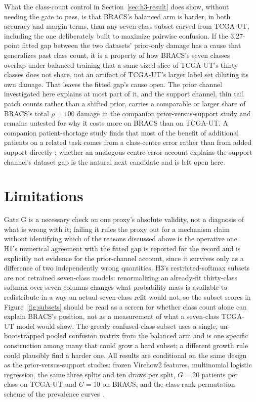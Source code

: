 What the class-count control in Section~\ref{sec:h3-result} does show, without needing the gate to pass, is that BRACS's balanced arm is harder, in both accuracy and margin terms, than any seven-class subset carved from TCGA-UT, including the one deliberately built to maximize pairwise confusion. If the 3.27-point fitted gap between the two datasets' prior-only damage has a cause that generalizes past class count, it is a property of how BRACS's seven classes overlap under balanced training that a same-sized slice of TCGA-UT's thirty classes does not share, not an artifact of TCGA-UT's larger label set diluting its own damage. That leaves the fitted gap's cause open. The prior channel investigated here explains at most part of it, and the support channel, thin tail patch counts rather than a shifted prior, carries a comparable or larger share of BRACS's total $\rho=100$ damage in the companion prior-versus-support study \citep{queisler2026causeBracs} and remains untested for why it costs more on BRACS than on TCGA-UT. A companion patient-shortage study finds that most of the benefit of additional patients on a related task comes from a class-centre error rather than from added support directly \citep{queisler2026centreError}; whether an analogous centre-error account explains the support channel's dataset gap is the natural next candidate and is left open here.

\section{Limitations}
\label{sec:limitations}
Gate G is a necessary check on one proxy's absolute validity, not a diagnosis of what is wrong with it; failing it rules the proxy out for a mechanism claim without identifying which of the reasons discussed above is the operative one. H1's numerical agreement with the fitted gap is reported for the record and is explicitly not evidence for the prior-channel account, since it survives only as a difference of two independently wrong quantities. H3's restricted-softmax subsets are not retrained seven-class models: renormalizing an already-fit thirty-class softmax over seven columns changes what probability mass is available to redistribute in a way an actual seven-class refit would not, so the subset scores in Figure~\ref{fig:subsets} should be read as a screen for whether class count alone can explain BRACS's position, not as a measurement of what a seven-class TCGA-UT model would show. The greedy confused-class subset uses a single, un-bootstrapped pooled confusion matrix from the balanced arm and is one specific construction among many that could grow a hard subset; a different growth rule could plausibly find a harder one. All results are conditional on the same design as the prior-versus-support studies: frozen Virchow2 features, multinomial logistic regression, the same three splits and ten draws per split, $G=20$ patients per class on TCGA-UT and $G=10$ on BRACS, and the class-rank permutation scheme of the prevalence curves \citep{queisler2026prevalenceTcga, queisler2026prevalenceBracs, queisler2026causeTcga, queisler2026causeBracs}.
